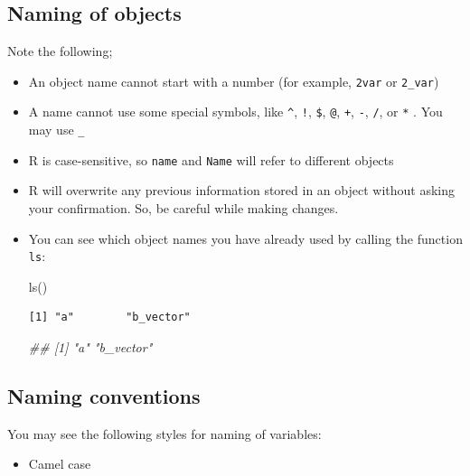 \documentclass[
  letterpaper,
  DIV=11,
  numbers=noendperiod]{scrreprt}
\newenvironment{Shaded}{\begin{snugshade}}{\end{snugshade}}
\newcommand{\DocumentationTok}[1]{\textcolor[rgb]{0.37,0.37,0.37}{\textit{#1}}}
\newcommand{\FunctionTok}[1]{\textcolor[rgb]{0.28,0.35,0.67}{#1}}
\newcommand{\NormalTok}[1]{\textcolor[rgb]{0.00,0.23,0.31}{#1}}
\providecommand{\tightlist}{%
  \setlength{\itemsep}{0pt}\setlength{\parskip}{0pt}}\usepackage{longtable,booktabs,array}
\begin{document}
\subsection{Naming of objects}\label{naming-of-objects}

Note the following;

\begin{itemize}
\item
  An object name cannot start with a number (for example, \texttt{2var}
  or \texttt{2\_var})
\item
  A name cannot use some special symbols, like \texttt{\^{}},
  \texttt{!}, \texttt{\$}, \texttt{@}, \texttt{+}, \texttt{-},
  \texttt{/}, or \texttt{*} . You may use \texttt{\_}
\item
  R is case-sensitive, so \texttt{name} and \texttt{Name} will refer to
  different objects
\item
  R will overwrite any previous information stored in an object without
  asking your confirmation. So, be careful while making changes.
\item
  You can see which object names you have already used by calling the
  function \texttt{ls}:

\begin{Shaded}
\begin{Highlighting}[]
\FunctionTok{ls}\NormalTok{()}
\end{Highlighting}
\end{Shaded}

\begin{verbatim}
[1] "a"        "b_vector"
\end{verbatim}

\begin{Shaded}
\begin{Highlighting}[]
\DocumentationTok{\#\# [1] "a"        "b\_vector"}
\end{Highlighting}
\end{Shaded}
\end{itemize}

\subsection{Naming conventions}\label{naming-conventions}

You may see the following styles for naming of variables:

\begin{itemize}
\tightlist
\item
  Camel case
\end{itemize}
\end{document}

